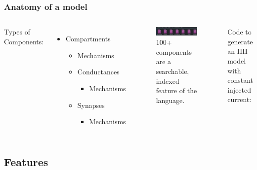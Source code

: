 \documentclass{beamer}
\begin{document}
\begin{frame}[fragile]
  \frametitle{Anatomy of a model}

  \begin{columns}

    Types of Components:

    \begin{itemize}
      \item Compartments
      \begin{itemize}
        \item Mechanisms
      \end{itemize}
      \begin{itemize}
        \item Conductances
        \begin{itemize}
          \item Mechanisms
        \end{itemize}
        \item Synapses
        \begin{itemize}
          \item Mechanisms
        \end{itemize}
      \end{itemize}
    \end{itemize}


    \begin{figure}
      \includegraphics[width=\textwidth]{gfx/liu.png}
      \centering
      \caption{100+ components are a searchable, indexed feature of the language.}
    \end{figure}


    Code to generate an HH model with constant injected current:

    \resizebox{\textwidth}{!}{}

  \end{columns}

\end{frame}

\subsection{Features}
\end{document}
